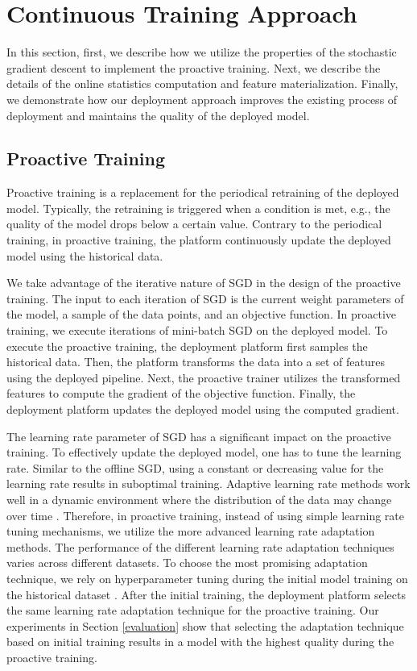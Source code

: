 \section{Continuous Training Approach} \label{continuous-training-serving}
In this section, first, we describe how we utilize the properties of the stochastic gradient descent to implement the proactive training.
Next, we describe the details of the online statistics computation and feature materialization.
Finally, we demonstrate how our deployment approach improves the existing process of deployment and maintains the quality of the deployed model.
\subsection{Proactive Training} \label{proactive-training}
Proactive training is a replacement for the periodical retraining of the deployed model.
Typically, the retraining is triggered when a condition is met, e.g., the quality of the model drops below a certain value.
Contrary to the periodical training, in proactive training, the platform continuously update the deployed model using the historical data.

We take advantage of the iterative nature of SGD in the design of the proactive training.
The input to each iteration of SGD is the current weight parameters of the model, a sample of the data points, and an objective function.
In proactive training, we execute iterations of mini-batch SGD on the deployed model.
To execute the proactive training, the deployment platform first samples the historical data.
Then, the platform transforms the data into a set of features using the deployed pipeline.
Next, the proactive trainer utilizes the transformed features to compute the gradient of the objective function.
Finally, the deployment platform updates the deployed model using the computed gradient.

The learning rate parameter of SGD has a significant impact on the proactive training.
To effectively update the deployed model, one has to tune the learning rate.
Similar to the offline SGD, using a constant or decreasing value for the learning rate results in suboptimal training.
Adaptive learning rate methods work well in a dynamic environment where the distribution of the data may change over time \cite{zeiler2012adadelta}.
Therefore, in proactive training, instead of using simple learning rate tuning mechanisms, we utilize the more advanced learning rate adaptation methods.
The performance of the different learning rate adaptation techniques varies across different datasets.
To choose the most promising adaptation technique, we rely on hyperparameter tuning during the initial model training on the historical dataset \cite{bergstra2012random}.
After the initial training, the deployment platform selects the same learning rate adaptation technique for the proactive training.
Our experiments in Section \ref{evaluation} show that selecting the adaptation technique based on initial training results in a model with the highest quality during the proactive training.

